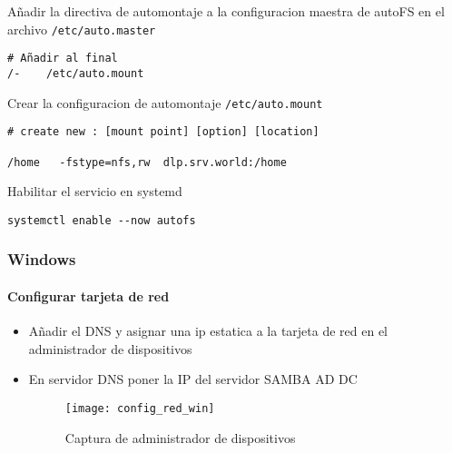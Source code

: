 \documentclass[../main.tex]{subfiles}
\begin{document}
\begin{enumerate}
Añadir la directiva de automontaje a la configuracion maestra de autoFS en el archivo \lstinline|/etc/auto.master|

\begin{lstlisting}
# Añadir al final
/-    /etc/auto.mount
\end{lstlisting}

Crear la configuracion de automontaje \lstinline|/etc/auto.mount|

\begin{lstlisting}
# create new : [mount point] [option] [location]

/home   -fstype=nfs,rw  dlp.srv.world:/home
\end{lstlisting}

Habilitar el servicio en systemd

\begin{lstlisting}
systemctl enable --now autofs 
\end{lstlisting}

\end{enumerate}


\newpage{}



\subsubsection{Windows}\label{sec:cliente_win}

\paragraph{Configurar tarjeta de red}\begin{itemize}
\item Añadir el DNS y asignar una ip estatica a la tarjeta de red en el administrador de dispositivos
\item En servidor DNS poner la IP del servidor SAMBA AD DC
  \begin{figure}[H]
    \centering
    \texttt{[image: config\_red\_win]}
    \caption{Captura de administrador de dispositivos}\label{fig:confrwin}
  \end{figure}
  
\end{itemize}

\newpage{}
\end{document}
